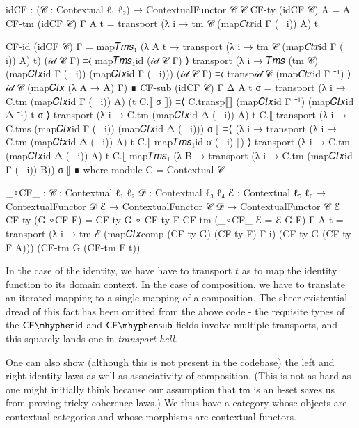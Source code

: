 \begin{AgdaMultiCode}
\begin{code}
idCF : (𝒞 : Contextual ℓ₁ ℓ₂) → ContextualFunctor 𝒞 𝒞
CF-ty (idCF 𝒞) A = A
CF-tm (idCF 𝒞) {Γ} {A} t = transport (λ i → tm 𝒞 (map𝐶𝑡𝑥id Γ (~ i)) A) t
\end{code}
\begin{code}[hide]
CF-id (idCF 𝒞) {Γ} =
  map𝑇𝑚𝑠₁ (λ {A} t → transport (λ i → tm 𝒞 (map𝐶𝑡𝑥id Γ (~ i)) A) t) (𝒾𝒹 𝒞 Γ)
    ≡⟨ map𝑇𝑚𝑠₁id (𝒾𝒹 𝒞 Γ) ⟩
  transport (λ i → 𝑇𝑚𝑠 (tm 𝒞) (map𝐶𝑡𝑥id Γ (~ i)) (map𝐶𝑡𝑥id Γ (~ i))) (𝒾𝒹 𝒞 Γ)
    ≡⟨ transp𝒾𝒹 𝒞 (map𝐶𝑡𝑥id Γ ⁻¹) ⟩
  𝒾𝒹 𝒞 (map𝐶𝑡𝑥 (λ A → A) Γ)
    ∎
CF-sub (idCF 𝒞) {Γ} {Δ} {A} t σ =
  transport (λ i → C.tm (map𝐶𝑡𝑥id Γ (~ i)) A) (t C.⟦ σ ⟧)
    ≡⟨ C.transp⟦⟧ (map𝐶𝑡𝑥id Γ ⁻¹) (map𝐶𝑡𝑥id Δ ⁻¹) t σ ⟩
  transport (λ i → C.tm (map𝐶𝑡𝑥id Δ (~ i)) A) t
    C.⟦ transport (λ i → C.tms (map𝐶𝑡𝑥id Γ (~ i)) (map𝐶𝑡𝑥id Δ (~ i))) σ ⟧
    ≡⟨ (λ i → transport (λ i → C.tm (map𝐶𝑡𝑥id Δ (~ i)) A) t C.⟦ map𝑇𝑚𝑠₁id σ (~ i) ⟧) ⟩
  transport (λ i → C.tm (map𝐶𝑡𝑥id Δ (~ i)) A) t
    C.⟦ map𝑇𝑚𝑠₁ (λ {B} → transport (λ i → C.tm (map𝐶𝑡𝑥id Γ (~ i)) B)) σ ⟧
    ∎ where
  module C = Contextual 𝒞
\end{code}
\begin{code}

_∘CF_ : {𝒞 : Contextual ℓ₁ ℓ₂} {𝒟 : Contextual ℓ₃ ℓ₄} {ℰ : Contextual ℓ₅ ℓ₆} →
  ContextualFunctor 𝒟 ℰ → ContextualFunctor 𝒞 𝒟 → ContextualFunctor 𝒞 ℰ
CF-ty (G ∘CF F) = CF-ty G ∘ CF-ty F
CF-tm (_∘CF_ {ℰ = ℰ} G F) {Γ} {A} t  =
  transport (λ i → tm ℰ (map𝐶𝑡𝑥comp (CF-ty G) (CF-ty F) Γ i) (CF-ty G (CF-ty F A)))
    (CF-tm G (CF-tm F t))
\end{code}
\end{AgdaMultiCode}

In the case of the identity, we have have to transport $t$ as to map the
identity function to its domain context. In the case of composition, we have to
translate an iterated mapping to a single mapping of a composition. The sheer
existential dread of this fact has been omitted from the above code - the
requisite types of the $\mathsf{CF\mhyphen id}$ and $\mathsf{CF\mhyphen sub}$
fields involve multiple transports, and this squarely lands one in
\emph{transport hell}.

One can also show (although this is not present in the codebase) the left and
right identity laws as well as associativity of composition. (This is not as
hard as one might initially think because our assumption that $\mathsf{tm}$ is
an h-set saves us from proving tricky coherence laws.) We thus have a category
whose objects are contextual categories and whose morphisms are contextual
functors.

